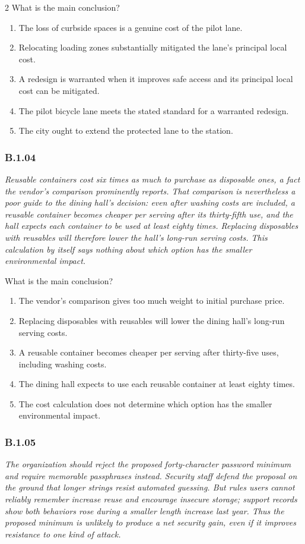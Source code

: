 \documentclass[10pt]{extarticle}
\newcommand{\choice}[1]{\item #1}
\newcommand{\bankitem}[1]{\subsubsection*{#1}}
\begin{document}
\begin{multicols}{2}
What is the main conclusion?
\begin{enumerate}[label=(\alph*)]
  \choice{The loss of curbside spaces is a genuine cost of the pilot lane.}
  \choice{Relocating loading zones substantially mitigated the lane's principal local cost.}
  \choice{A redesign is warranted when it improves safe access and its principal local cost can be mitigated.}
  \choice{The pilot bicycle lane meets the stated standard for a warranted redesign.}
  \choice{The city ought to extend the protected lane to the station.}
\end{enumerate}
\bankitem{B.1.04}
\emph{Reusable containers cost six times as much to purchase as disposable ones, a fact the vendor's comparison prominently reports. That comparison is nevertheless a poor guide to the dining hall's decision: even after washing costs are included, a reusable container becomes cheaper per serving after its thirty-fifth use, and the hall expects each container to be used at least eighty times. Replacing disposables with reusables will therefore lower the hall's long-run serving costs. This calculation by itself says nothing about which option has the smaller environmental impact.}

What is the main conclusion?
\begin{enumerate}[label=(\alph*)]
  \choice{The vendor's comparison gives too much weight to initial purchase price.}
  \choice{Replacing disposables with reusables will lower the dining hall's long-run serving costs.}
  \choice{A reusable container becomes cheaper per serving after thirty-five uses, including washing costs.}
  \choice{The dining hall expects to use each reusable container at least eighty times.}
  \choice{The cost calculation does not determine which option has the smaller environmental impact.}
\end{enumerate}
\bankitem{B.1.05}
\emph{The organization should reject the proposed forty-character password minimum and require memorable passphrases instead. Security staff defend the proposal on the ground that longer strings resist automated guessing. But rules users cannot reliably remember increase reuse and encourage insecure storage; support records show both behaviors rose during a smaller length increase last year. Thus the proposed minimum is unlikely to produce a net security gain, even if it improves resistance to one kind of attack.}


\end{multicols}
\end{document}
